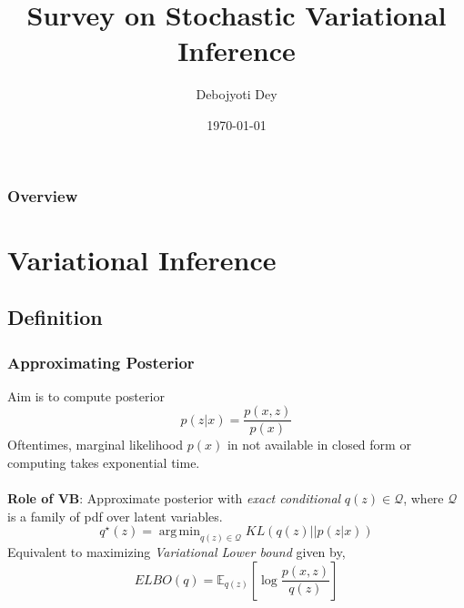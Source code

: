 \documentclass{beamer}
\title[Stochastic VB]{Survey on Stochastic Variational Inference } %
\author{Debojyoti Dey} %
\institute[IITK] %
{
Indian Institute of Technology Kanpur \\ %
\medskip
\textit{debojyot@cse.iitk.ac.in} %
}
\date{\today} %
\DeclareMathOperator*{\argmin}{arg\,min}
\newcommand{\E}{\mathbb{E}}
\begin{document}
\begin{frame}
\titlepage %
\end{frame}

\begin{frame}
\frametitle{Overview} %
\tableofcontents %
\end{frame}


\section{Variational Inference} %


\subsection{Definition}
\begin{frame}
\frametitle{Approximating Posterior}
Aim is to compute posterior
\[
p(z|x)=\frac{p(x,z)}{p(x)}
\]
Oftentimes, marginal likelihood $p(x)$ in not available in closed form or computing takes exponential time.\\~\\

\textbf{Role of VB}: Approximate posterior with \textit{exact conditional} $q(z)\in \mathcal{Q}$, where $\mathcal{Q}$ is a family of pdf over latent variables.
\[
q^\star(z)=\argmin_{q(z)\in \mathcal{Q}} KL(q(z)||p(z|x))
\]
Equivalent to maximizing \textit{Variational Lower bound} given by,
\[
ELBO(q)=\E_{q(z)}\left[\log\frac{p(x,z)}{q(z)}\right]
\]

\end{frame}
\end{document}
